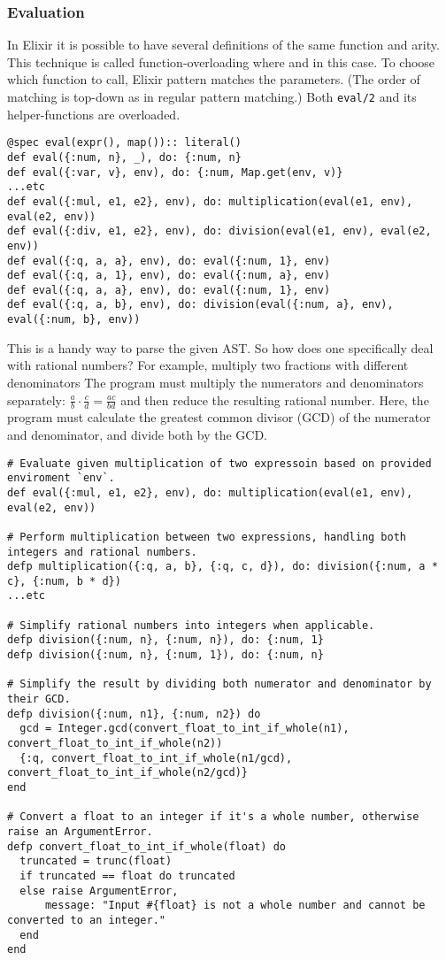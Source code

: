 \documentclass[a4paper,11pt]{article}
\begin{document}
\subsubsection*{Evaluation}
In Elixir it is possible to have several definitions of the same function and arity.
This technique is called function-overloading where and in this case.
To choose which function to call,
Elixir pattern matches the parameters.
(The order of matching is top-down as in regular pattern matching.)
Both
\texttt{eval/2} and its helper-functions
are overloaded.
\begin{verbatim}
@spec eval(expr(), map()):: literal()
def eval({:num, n}, _), do: {:num, n}
def eval({:var, v}, env), do: {:num, Map.get(env, v)}
...etc
def eval({:mul, e1, e2}, env), do: multiplication(eval(e1, env), eval(e2, env))
def eval({:div, e1, e2}, env), do: division(eval(e1, env), eval(e2, env))
def eval({:q, a, a}, env), do: eval({:num, 1}, env)
def eval({:q, a, 1}, env), do: eval({:num, a}, env)
def eval({:q, a, a}, env), do: eval({:num, 1}, env)
def eval({:q, a, b}, env), do: division(eval({:num, a}, env), eval({:num, b}, env))
\end{verbatim}
This is a handy way to parse the given AST.
So how does one specifically deal with rational numbers?
For example, multiply two fractions with different denominators
The program must multiply the numerators and denominators separately:
$\frac{a}{b} \cdot \frac{c}{d} = \frac{ac}{bd}$
and then reduce the resulting rational number.
Here, the program must calculate the greatest common divisor (GCD)
of the numerator and denominator, and divide both by the GCD.
\begin{verbatim}
# Evaluate given multiplication of two expressoin based on provided enviroment `env`.
def eval({:mul, e1, e2}, env), do: multiplication(eval(e1, env), eval(e2, env))

# Perform multiplication between two expressions, handling both integers and rational numbers.
defp multiplication({:q, a, b}, {:q, c, d}), do: division({:num, a * c}, {:num, b * d})
...etc

# Simplify rational numbers into integers when applicable.
defp division({:num, n}, {:num, n}), do: {:num, 1}
defp division({:num, n}, {:num, 1}), do: {:num, n}

# Simplify the result by dividing both numerator and denominator by their GCD.
defp division({:num, n1}, {:num, n2}) do
  gcd = Integer.gcd(convert_float_to_int_if_whole(n1), convert_float_to_int_if_whole(n2))
  {:q, convert_float_to_int_if_whole(n1/gcd), convert_float_to_int_if_whole(n2/gcd)}
end

# Convert a float to an integer if it's a whole number, otherwise raise an ArgumentError.
defp convert_float_to_int_if_whole(float) do
  truncated = trunc(float)
  if truncated == float do truncated
  else raise ArgumentError,
      message: "Input #{float} is not a whole number and cannot be converted to an integer."
  end
end
\end{verbatim}
\end{document}
